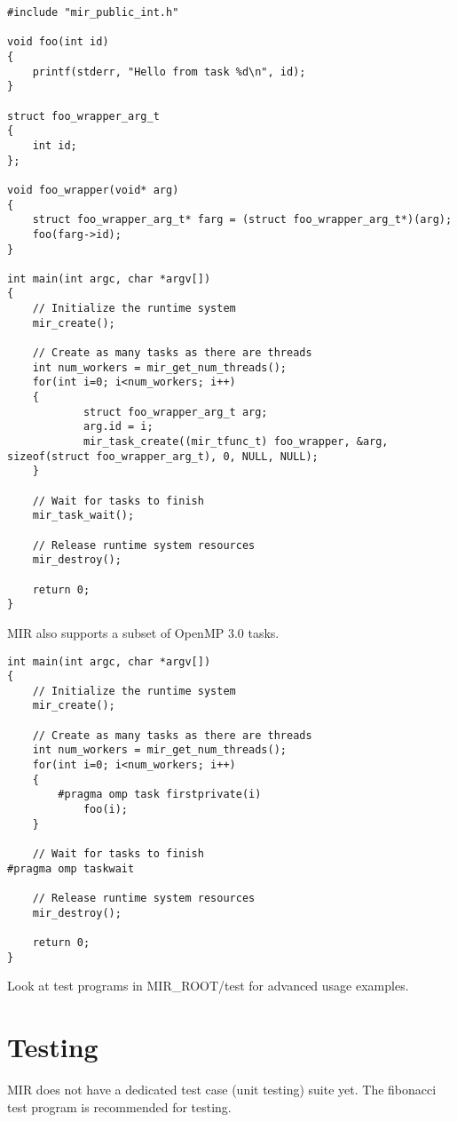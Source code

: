 \documentclass[11pt,a4paper,notitlepage]{article}
\begin{document}
\begin{lstlisting}[style=BashInputStyle]
#include "mir_public_int.h"

void foo(int id)
{
    printf(stderr, "Hello from task %d\n", id);
}

struct foo_wrapper_arg_t 
{
    int id;
};

void foo_wrapper(void* arg)
{
    struct foo_wrapper_arg_t* farg = (struct foo_wrapper_arg_t*)(arg);
    foo(farg->id);
}

int main(int argc, char *argv[])
{
    // Initialize the runtime system
    mir_create();

    // Create as many tasks as there are threads
    int num_workers = mir_get_num_threads();
    for(int i=0; i<num_workers; i++)
    {
            struct foo_wrapper_arg_t arg;
            arg.id = i;
            mir_task_create((mir_tfunc_t) foo_wrapper, &arg, sizeof(struct foo_wrapper_arg_t), 0, NULL, NULL);
    }
        
    // Wait for tasks to finish
    mir_task_wait();

    // Release runtime system resources
    mir_destroy();

    return 0;
}
\end{lstlisting}

MIR also supports a subset of OpenMP 3.0 tasks. 

\begin{lstlisting}[style=BashInputStyle]
int main(int argc, char *argv[])
{
    // Initialize the runtime system
    mir_create();

    // Create as many tasks as there are threads
    int num_workers = mir_get_num_threads();
    for(int i=0; i<num_workers; i++)
    {
        #pragma omp task firstprivate(i)
            foo(i);
    }
        
    // Wait for tasks to finish
#pragma omp taskwait

    // Release runtime system resources
    mir_destroy();

    return 0;
}
\end{lstlisting}

Look at test programs in MIR\_ROOT/test for advanced usage examples.

\section{Testing}
MIR does not have a dedicated test case (unit testing) suite yet. The fibonacci test program is recommended for testing.
\end{document}
